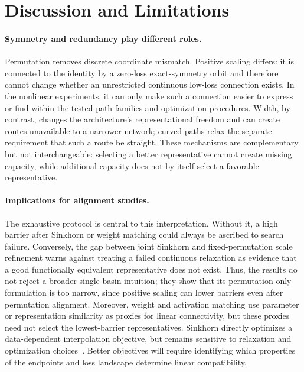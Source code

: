 \documentclass[twoside]{article}
\begin{document}
\FloatBarrier
\section{Discussion and Limitations}

\paragraph{Symmetry and redundancy play different roles.}
Permutation removes discrete coordinate mismatch.  Positive scaling differs:
it is connected to the identity by a zero-loss exact-symmetry orbit and
therefore cannot change whether an unrestricted continuous low-loss connection
exists.  In the nonlinear experiments, it can only make such a connection
easier to express or find within the tested path families and optimization
procedures.  Width, by contrast, changes the architecture's representational
freedom and can create routes unavailable to a narrower network; curved paths
relax the separate requirement that such a route be straight.  These
mechanisms are complementary but not interchangeable: selecting a better
representative cannot create missing capacity, while additional capacity does
not by itself select a favorable representative.

\paragraph{Implications for alignment studies.}
The exhaustive protocol is central to this interpretation.  Without it, a high
barrier after Sinkhorn or weight matching could always be ascribed to search
failure.  Conversely, the gap between joint Sinkhorn and fixed-permutation
scale refinement warns against treating a failed continuous relaxation as
evidence that a good functionally equivalent representative does not exist.
Thus, the results do not reject a broader single-basin intuition; they show
that its permutation-only formulation is too narrow, since positive scaling
can lower barriers even after permutation alignment.
Moreover, weight and activation matching use parameter or representation
similarity as
proxies for linear connectivity, but these proxies need not select the
lowest-barrier representatives.  Sinkhorn directly optimizes a data-dependent
interpolation objective, but remains sensitive to relaxation and optimization
choices~\citep{ainsworth2023git,guerrero2023rebasin}.  Better objectives will
require identifying which properties of the endpoints and loss landscape
determine linear compatibility.
\end{document}
